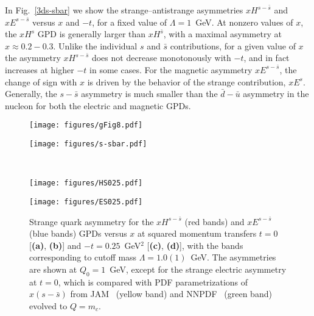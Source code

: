 \documentclass[preprintnumbers,prd,superscriptaddress,preprint]{revtex4-1}
\begin{document}
In Fig.~\ref{3ds-sbar} we show the strange--antistrange asymmetries $xH^{s-\bar{s}}$ and $xE^{s-\bar{s}}$ versus $x$ and $-t$, for a fixed value of $\Lambda = 1$~GeV.
At nonzero values of $x$, the $xH^s$ GPD is generally larger than $xH^{\bar{s}}$, with a maximal asymmetry at $x \approx 0.2-0.3$. 
Unlike the individual $s$ and $\bar s$ contributions, for a given value of $x$ the asymmetry $xH^{s-\bar{s}}$ does not decrease monotonously with $-t$, and in fact increases at higher $-t$ in some cases.
For the magnetic asymmetry $xE^{s-\bar{s}}$, the change of sign with $x$ is driven by the behavior of the strange contribution, $xE^s$.
Generally, the $s-\bar{s}$ asymmetry is much smaller than the $\bar{d}-\bar{u}$ asymmetry in the nucleon for both the electric and magnetic GPDs.


\begin{figure}[htbp] %
\begin{minipage}[b]{.45\linewidth}
\hspace*{-0.55cm}\texttt{[image: figures/gFig8.pdf]} 
 \vspace{0pt}
\end{minipage}
\hfill
\begin{minipage}[b]{.45\linewidth}   
\hspace*{-1.1cm} \texttt{[image: figures/s-sbar.pdf]} 
   \vspace{14pt}
\end{minipage}  
\\[-0.4cm]
\begin{minipage}[t]{.45\linewidth}
\hspace*{-0.3cm}\texttt{[image: figures/HS025.pdf]}   
 \vspace{0pt}
\end{minipage}
\hfill
\begin{minipage}[t]{.45\linewidth}   
\hspace*{-1.15cm} \texttt{[image: figures/ES025.pdf]}  
   \vspace{0pt}
\end{minipage} 
\caption{Strange quark asymmetry for the $xH^{s-\bar{s}}$ (red bands) and $xE^{s-\bar{s}}$ (blue bands) GPDs versus $x$ at squared momentum transfers $t=0$ [{\bf (a)}, {\bf (b)}] and $-t = 0.25$~GeV$^2$ [{\bf (c)}, {\bf (d)}], with the bands corresponding to cutoff mass $\Lambda=1.0(1)$~GeV. The asymmetries are shown at $Q_0=1$~GeV, except for the strange electric asymmetry at $t=0$, which is compared with PDF parametrizations of $x(s-\bar s)$ from JAM~\cite{Cocuzza:2021cbi} (yellow band) and NNPDF~\cite{Faura:2020oom} (green band) evolved to $Q=m_c$.}
\label{2ds-sbart0}
\end{figure}
\end{document}
